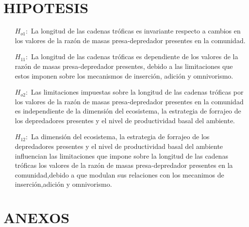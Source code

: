 \documentclass [11pt,a4paper]{article}
\numberwithin{equation}{section}
\begin{document}
\section{HIPOTESIS}
\begin{itemize}
\item[$H_{o1}:$] La longitud de las cadenas tr\'oficas es invariante respecto a cambios en los valores de la raz\'on de masas presa-depredador presentes en la comunidad.
\item[$H_{11}:$] La longitud de las cadenas tr\'oficas es dependiente de los valores de la raz\'on de masas presa-depredador presentes, debido a las limitaciones que estos imponen sobre los mecanismos de inserci\'on, adici\'on y omnivorismo.

\item[$H_{o2}:$] Las limitaciones impuestas sobre la longitud de las cadenas tr\'oficas por los  valores de la raz\'on de masas presa-depredador presentes en la comunidad es independiente de la dimensi\'on del ecosistema, la estrategia de forrajeo de los depredadores presentes y el nivel de productividad basal del ambiente.
\item[$H_{12}:$] La dimensi\'on del ecosistema, la estrategia de forrajeo de los depredadores presentes y el nivel de productividad basal del ambiente influencian las limitaciones que impone sobre la longitud de las cadenas tr\'oficas los valores de la raz\'on de masas presa-depredador presentes en la comunidad,debido a que modulan sus relaciones con los mecanimos de inserci\'on,adici\'on y omnivorismo.

\end{itemize}









%
%

\printbibliography
\newpage
\section{ANEXOS}


\newpage
\end{document}
